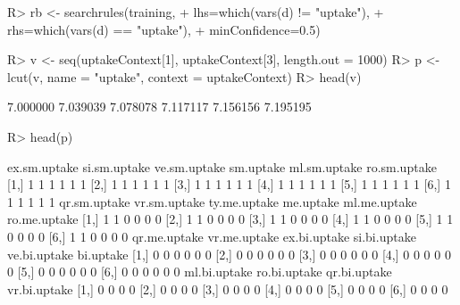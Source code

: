 \documentclass{article}\usepackage[]{graphicx}\usepackage[]{color}
\begin{document}
\begin{Schunk}
% --begin: "pbld4"
\begin{Sinput}
R> rb <- searchrules(training,
+                    lhs=which(vars(d) != "uptake"),
+                    rhs=which(vars(d) == "uptake"),
+                    minConfidence=0.5)
\end{Sinput}
%
% --end: "pbld4"
\end{Schunk}

\begin{Schunk}
% --begin: "pbld5"
\begin{Sinput}
R> v <- seq(uptakeContext[1], uptakeContext[3], length.out = 1000)
R> p <- lcut(v, name = "uptake", context = uptakeContext)
R> head(v)
\end{Sinput}
\begin{Soutput}
[1] 7.000000 7.039039 7.078078 7.117117 7.156156 7.195195
\end{Soutput}
\begin{Sinput}
R> head(p)
\end{Sinput}
\begin{Soutput}
     ex.sm.uptake si.sm.uptake ve.sm.uptake sm.uptake ml.sm.uptake ro.sm.uptake
[1,]            1            1            1         1            1            1
[2,]            1            1            1         1            1            1
[3,]            1            1            1         1            1            1
[4,]            1            1            1         1            1            1
[5,]            1            1            1         1            1            1
[6,]            1            1            1         1            1            1
     qr.sm.uptake vr.sm.uptake ty.me.uptake me.uptake ml.me.uptake ro.me.uptake
[1,]            1            1            0         0            0            0
[2,]            1            1            0         0            0            0
[3,]            1            1            0         0            0            0
[4,]            1            1            0         0            0            0
[5,]            1            1            0         0            0            0
[6,]            1            1            0         0            0            0
     qr.me.uptake vr.me.uptake ex.bi.uptake si.bi.uptake ve.bi.uptake bi.uptake
[1,]            0            0            0            0            0         0
[2,]            0            0            0            0            0         0
[3,]            0            0            0            0            0         0
[4,]            0            0            0            0            0         0
[5,]            0            0            0            0            0         0
[6,]            0            0            0            0            0         0
     ml.bi.uptake ro.bi.uptake qr.bi.uptake vr.bi.uptake
[1,]            0            0            0            0
[2,]            0            0            0            0
[3,]            0            0            0            0
[4,]            0            0            0            0
[5,]            0            0            0            0
[6,]            0            0            0            0
\end{Soutput}
%
% --end: "pbld5"
\end{Schunk}
\end{document}
